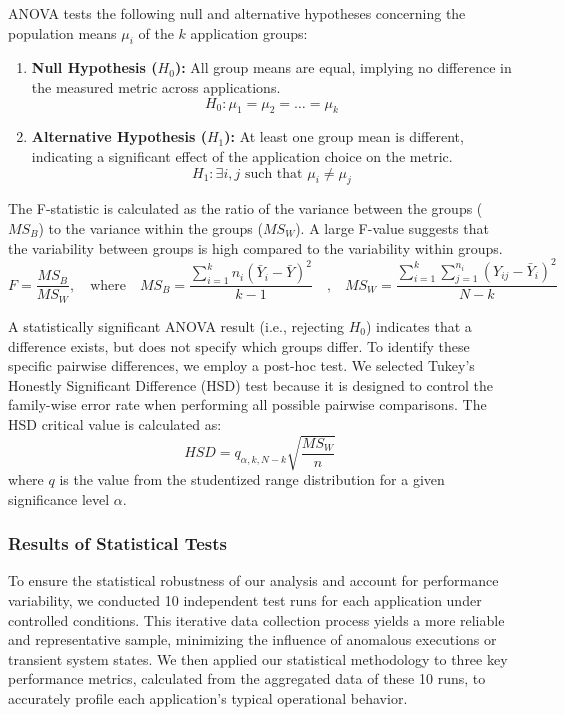 \documentclass[a4paper,12pt]{report}
\begin{document}
ANOVA tests the following null and alternative hypotheses concerning the population means \( \mu_i \) of the \( k \) application groups:
\begin{enumerate}[label=\roman*.]
    \item \textbf{Null Hypothesis ($H_0$):} All group means are equal, implying no difference in the measured metric across applications.
    $$ H_0: \mu_1 = \mu_2 = \dots = \mu_k $$
    \item \textbf{Alternative Hypothesis ($H_1$):} At least one group mean is different, indicating a significant effect of the application choice on the metric.
    $$ H_1: \exists i, j \text{ such that } \mu_i \neq \mu_j $$
\end{enumerate}
The F-statistic is calculated as the ratio of the variance between the groups ($MS_B$) to the variance within the groups ($MS_W$). A large F-value suggests that the variability between groups is high compared to the variability within groups.
$$
F = \frac{MS_B}{MS_W}, \quad \text{where} \quad MS_B = \frac{\sum_{i=1}^k n_i (\bar{Y}_i - \bar{Y})^2}{k-1} \quad \text{,} \quad MS_W = \frac{\sum_{i=1}^k \sum_{j=1}^{n_i} (Y_{ij} - \bar{Y}_i)^2}{N - k}
$$


A statistically significant ANOVA result (i.e., rejecting $H_0$) indicates that a difference exists, but does not specify which groups differ. To identify these specific pairwise differences, we employ a post-hoc test. We selected Tukey's Honestly Significant Difference (HSD) test because it is designed to control the family-wise error rate when performing all possible pairwise comparisons. The HSD critical value is calculated as:
$$
HSD = q_{\alpha, k, N-k} \sqrt{\frac{MS_W}{n}}
$$
where \( q \) is the value from the studentized range distribution for a given significance level \( \alpha \).

\subsubsection{Results of Statistical Tests}

To ensure the statistical robustness of our analysis and account for performance variability, we conducted 10 independent test runs for each application under controlled conditions. This iterative data collection process yields a more reliable and representative sample, minimizing the influence of anomalous executions or transient system states. We then applied our statistical methodology to three key performance metrics, calculated from the aggregated data of these 10 runs, to accurately profile each application's typical operational behavior.
\end{document}

